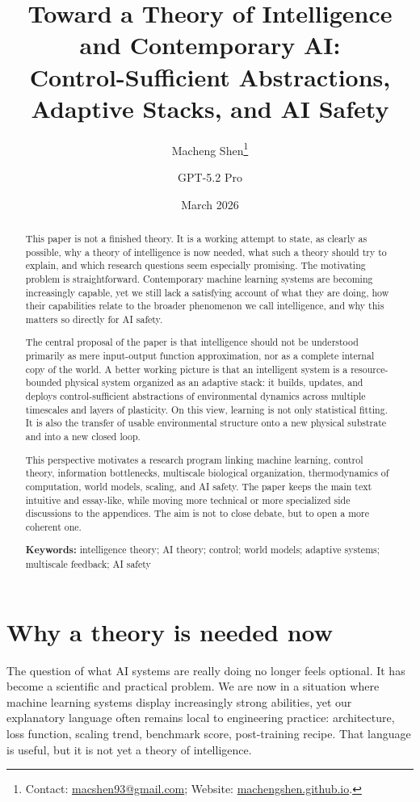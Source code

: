 \documentclass[11pt]{article}
\title{Toward a Theory of Intelligence and Contemporary AI: \\ Control-Sufficient Abstractions, Adaptive Stacks, and AI Safety}
\author{Macheng Shen\thanks{Contact: \href{mailto:macshen93@gmail.com}{macshen93@gmail.com}; Website: \href{https://machengshen.github.io}{machengshen.github.io}.} \and GPT-5.2 Pro}
\date{March 2026}
\begin{document}
\maketitle

\begin{abstract}

This paper is not a finished theory. It is a working attempt to state, as clearly as possible, why a theory of intelligence is now needed, what such a theory should try to explain, and which research questions seem especially promising. The motivating problem is straightforward. Contemporary machine learning systems are becoming increasingly capable, yet we still lack a satisfying account of what they are doing, how their capabilities relate to the broader phenomenon we call intelligence, and why this matters so directly for AI safety.

The central proposal of the paper is that intelligence should not be understood primarily as mere input-output function approximation, nor as a complete internal copy of the world. A better working picture is that an intelligent system is a resource-bounded physical system organized as an adaptive stack: it builds, updates, and deploys control-sufficient abstractions of environmental dynamics across multiple timescales and layers of plasticity. On this view, learning is not only statistical fitting. It is also the transfer of usable environmental structure onto a new physical substrate and into a new closed loop.

This perspective motivates a research program linking machine learning, control theory, information bottlenecks, multiscale biological organization, thermodynamics of computation, world models, scaling, and AI safety. The paper keeps the main text intuitive and essay-like, while moving more technical or more specialized side discussions to the appendices. The aim is not to close debate, but to open a more coherent one.

\textbf{Keywords:} intelligence theory; AI theory; control; world models; adaptive systems; multiscale feedback; AI safety

\end{abstract}

\section{Why a theory is needed now}


The question of what AI systems are really doing no longer feels optional. It has become a scientific and practical problem. We are now in a situation where machine learning systems display increasingly strong abilities, yet our explanatory language often remains local to engineering practice: architecture, loss function, scaling trend, benchmark score, post-training recipe. That language is useful, but it is not yet a theory of intelligence.
\end{document}
